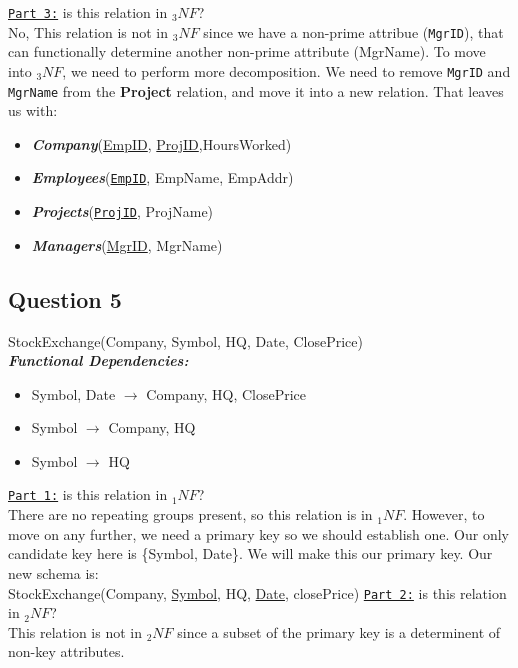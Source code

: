 \documentclass[letterpaper, 11pt]{article}
\newcommand{\1}{\mathds{1}}	%
\theoremstyle{definition}
\begin{document}
\bigbreak \noindent
\underline{\texttt{Part 3:}} is this relation in $_3NF$? \\
No, This relation is not in $_3NF$ since we have a non-prime attribue (\texttt{MgrID}), that can functionally determine another non-prime attribute (MgrName). To move into $_3NF$, we need to perform more decomposition. We need to remove \texttt{MgrID} and \texttt{MgrName} from the \textbf{Project} relation, and move it into a new relation. That leaves us with:
\begin{itemize}
    \item[\ding{228}] \textit{\textbf{Company}}(\underline{EmpID}, \underline{ProjID},HoursWorked)
    \item[\ding{228}] \textit{\textbf{Employees}}(\texttt{\underline{EmpID}}, EmpName, EmpAddr)
    \item[\ding{228}] \textit{\textbf{Projects}}(\underline{\texttt{ProjID}}, ProjName)
    \item[\ding{228}] \textit{\textbf{Managers}}(\underline{MgrID}, MgrName)
\end{itemize}

\subsection*{Question 5}
\begin{mdframed}
StockExchange(Company, Symbol, HQ, Date, ClosePrice) \vspace{2mm} \\
\textit{\textbf{Functional Dependencies:}}
\begin{itemize}
    \item[\ding{228}] Symbol, Date $\rightarrow$ Company, HQ, ClosePrice
    \item[\ding{228}] Symbol $\rightarrow$ Company, HQ
    \item[\ding{228}] Symbol $\rightarrow$ HQ
\end{itemize}
\end{mdframed}
\underline{\texttt{Part 1:}} is this relation in $_1NF$? \\
There are no repeating groups present, so this relation is in $_1NF$.
\bigbreak \noindent
However, to move on any further, we need a primary key so we should establish one. Our only candidate key here is \{Symbol, Date\}. We will make this our primary key. Our new schema is: \vspace{2mm} \\
StockExchange(Company, \underline{Symbol}, HQ, \underline{Date}, closePrice)
\bigbreak \noindent
\underline{\texttt{Part 2:}} is this relation in $_2NF$? \\
This relation is not in $_2NF$ since a subset of the primary key is a determinent of non-key attributes.
\end{document}
